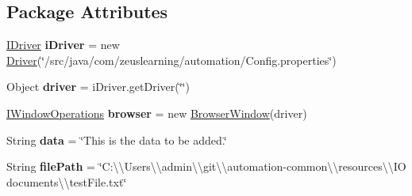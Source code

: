 \subsection*{Package Attributes}
\begin{DoxyCompactItemize}
\item 
\hypertarget{classcom_1_1zeuslearning_1_1automation_1_1unittests_1_1ReadWriteOperations_aff1e45f0a12d8d50eeb200ce6193bb9a}{}\label{classcom_1_1zeuslearning_1_1automation_1_1unittests_1_1ReadWriteOperations_aff1e45f0a12d8d50eeb200ce6193bb9a} 
\hyperlink{interfacecom_1_1zeuslearning_1_1automation_1_1driver_1_1IDriver}{I\+Driver} {\bfseries i\+Driver} = new \hyperlink{classcom_1_1zeuslearning_1_1automation_1_1selenium_1_1driver_1_1Driver}{Driver}(\char`\"{}/src/java/com/zeuslearning/automation/Config.\+properties\char`\"{})
\item 
\hypertarget{classcom_1_1zeuslearning_1_1automation_1_1unittests_1_1ReadWriteOperations_a061aae69f84b524be31d92596cfd24d2}{}\label{classcom_1_1zeuslearning_1_1automation_1_1unittests_1_1ReadWriteOperations_a061aae69f84b524be31d92596cfd24d2} 
Object {\bfseries driver} = i\+Driver.\+get\+Driver(\char`\"{}\char`\"{})
\item 
\hypertarget{classcom_1_1zeuslearning_1_1automation_1_1unittests_1_1ReadWriteOperations_a63fc111872e667642dcb5b9812e82e58}{}\label{classcom_1_1zeuslearning_1_1automation_1_1unittests_1_1ReadWriteOperations_a63fc111872e667642dcb5b9812e82e58} 
\hyperlink{interfacecom_1_1zeuslearning_1_1automation_1_1interactions_1_1IWindowOperations}{I\+Window\+Operations} {\bfseries browser} = new \hyperlink{classcom_1_1zeuslearning_1_1automation_1_1selenium_1_1interactions_1_1BrowserWindow}{Browser\+Window}(driver)
\item 
\hypertarget{classcom_1_1zeuslearning_1_1automation_1_1unittests_1_1ReadWriteOperations_a229be8258337e947627ec63e5052ee27}{}\label{classcom_1_1zeuslearning_1_1automation_1_1unittests_1_1ReadWriteOperations_a229be8258337e947627ec63e5052ee27} 
String {\bfseries data} = \char`\"{}This is the data to be added.\char`\"{}
\item 
\hypertarget{classcom_1_1zeuslearning_1_1automation_1_1unittests_1_1ReadWriteOperations_a31de92dcbe654524b084d9350fec6c1f}{}\label{classcom_1_1zeuslearning_1_1automation_1_1unittests_1_1ReadWriteOperations_a31de92dcbe654524b084d9350fec6c1f} 
String {\bfseries file\+Path} = \char`\"{}C\+:\textbackslash{}\textbackslash{}\+Users\textbackslash{}\textbackslash{}admin\textbackslash{}\textbackslash{}git\textbackslash{}\textbackslash{}automation-\/common\textbackslash{}\textbackslash{}resources\textbackslash{}\textbackslash{}\+IO documents\textbackslash{}\textbackslash{}test\+File.\+txt\char`\"{}

\end{DoxyCompactItemize}
